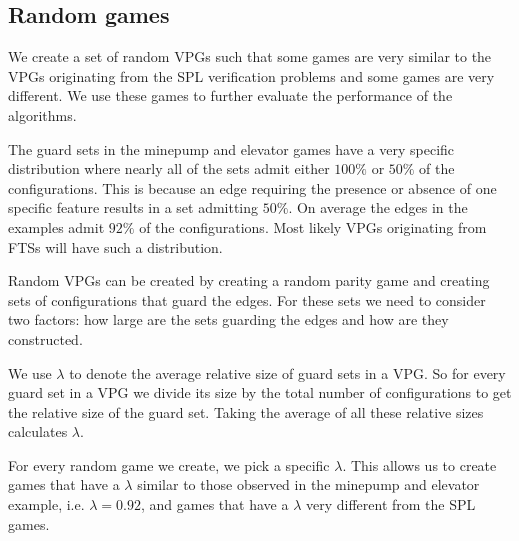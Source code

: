 \subsection{Random games}
We create a set of random VPGs such that some games are very similar to the VPGs originating from the SPL verification problems and some games are very different. We use these games to further evaluate the performance of the algorithms.

The guard sets in the minepump and elevator games have a very specific distribution where nearly all of the sets admit either $100\%$ or $50\%$ of the configurations. This is because an edge requiring the presence or absence of one specific feature results in a set admitting $50\%$. On average the edges in the examples admit $92\%$ of the configurations. Most likely VPGs originating from FTSs will have such a distribution.

Random VPGs can be created by creating a random parity game and creating sets of configurations that guard the edges. For these sets we need to consider two factors: how large are the sets guarding the edges and how are they constructed.

We use $\lambda$ to denote the average relative size of guard sets in a VPG. So for every guard set in a VPG we divide its size by the total number of configurations to get the relative size of the guard set. Taking the average of all these relative sizes calculates $\lambda$.

For every random game we create, we pick a specific $\lambda$. This allows us to create games that have a $\lambda$ similar to those observed in the minepump and elevator example, i.e. $\lambda = 0.92$, and games that have a $\lambda$ very different from the SPL games.

